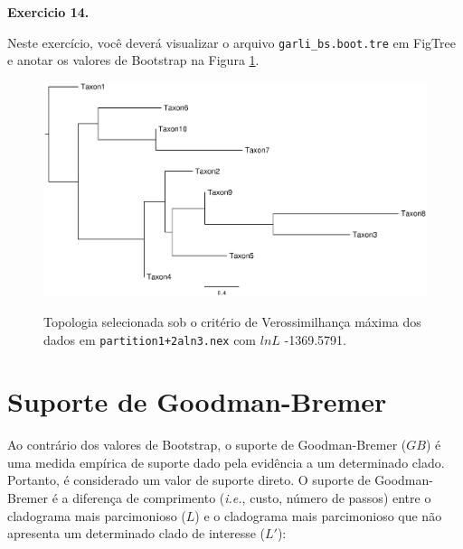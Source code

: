 \begin{refsection}
\begin{blackBlock}{\textbf{Exercicio 14.}}\label{tut14:ex:14.3}

Neste exercício, você deverá visualizar o arquivo \texttt{garli\_bs.boot.tre} em FigTree e anotar os valores de Bootstrap na Figura \ref{tut14:fig:treml}.

\end{blackBlock}





  \begin{figure}[h!]
      {\includegraphics[scale=0.65]{figures/tut14/garlirunbest.eps}}
	{\caption[Topologia de verossimilhançca para \texttt{partition1+2aln3.nex}.]{Topologia selecionada sob o critério de Verossimilhança máxima dos dados em \texttt{partition1+2aln3.nex} com  $lnL$ -1369.5791.}\label{tut14:fig:treml}}

  \end{figure}



\section{Suporte de Goodman-Bremer}\label{tut14:bremer}

Ao contrário dos valores de Bootstrap, o suporte de Goodman-Bremer ($GB$) \parencite{GoodmanETAL1982,Bremer1988} é uma medida empírica de suporte dado pela evidência a um determinado clado. Portanto, é considerado um valor de suporte direto. O suporte de Goodman-Bremer é a diferença de comprimento (\textit{i.e.}, custo, número de passos) entre o cladograma mais parcimonioso ($L$) e o cladograma mais parcimonioso que não apresenta um determinado clado de interesse ($L'$):


\end{refsection}
